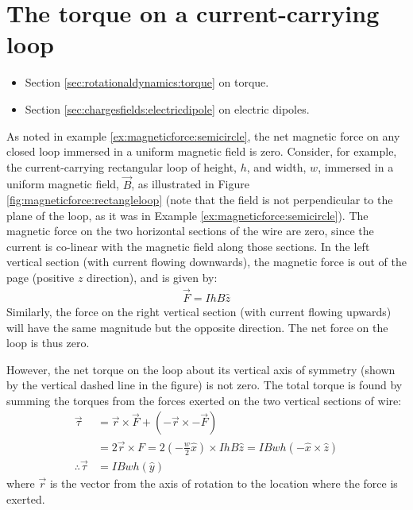 \section{The torque on a current-carrying loop}
\begin{review}
	\begin{itemize}
		\item Section \ref{sec:rotationaldynamics:torque} on torque.
		\item Section \ref{sec:chargesfields:electricdipole} on electric dipoles.
	\end{itemize}
\end{review}
As noted in example \ref{ex:magneticforce:semicircle}, the net magnetic force on any closed loop immersed in a uniform magnetic field is zero. Consider, for example, the current-carrying rectangular loop of height, $h$, and width, $w$, immersed in a uniform magnetic field, $\vec B$, as illustrated in Figure \ref{fig:magneticforce:rectangleloop} (note that the field is not perpendicular to the plane of the loop, as it was in Example \ref{ex:magneticforce:semicircle}).
The magnetic force on the two horizontal sections of the wire are zero, since the current is co-linear with the magnetic field along those sections. In the left vertical section (with current flowing downwards), the magnetic force is out of the page (positive $z$ direction), and is given by:
\begin{align*}
\vec F = IhB\hat z
\end{align*}
Similarly, the force on the right vertical section (with current flowing upwards) will have the same magnitude but the opposite direction. The net force on the loop is thus zero. 

However, the net torque on the loop about its vertical axis of symmetry (shown by the vertical dashed line in the figure) is not zero. The total torque is found by summing the torques from the forces exerted on the two vertical sections of wire:
\begin{align*}
\vec \tau &= \vec r\times \vec F + (-\vec r \times - \vec F)\\
&= 2 \vec r \times F = 2 \left(-\frac{w}{2}\hat x\right) \times IhB\hat z = IBwh (-\hat x\times \hat z)\\
\therefore \vec \tau&=IBwh (\hat y)
\end{align*}
where $\vec r$ is the vector from the axis of rotation to the location where the force is exerted.

